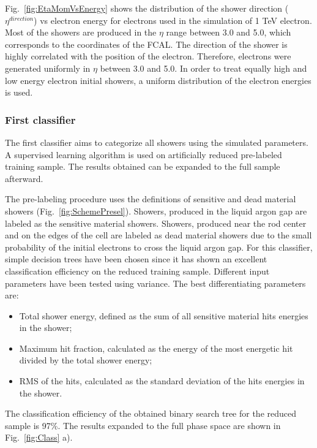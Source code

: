 Fig.~\ref{fig:EtaMomVsEnergy} shows the distribution of the shower direction ($\eta^{direction}$) vs electron energy for electrons used in the simulation of 1 TeV electron. Most of the showers are produced in the $\eta$ range between 3.0 and 5.0, which corresponds to the coordinates of the FCAL. The direction of the shower is highly correlated with the position of the electron. Therefore, electrons were generated uniformly in $\eta$ between 3.0 and 5.0. In order to treat equally high and low energy electron initial showers, a uniform distribution of the electron energies is used.

\begin{figure}[!tbp]
\end{figure}

\subsubsection{First classifier}

The first classifier aims to categorize all showers using the simulated parameters. A supervised learning algorithm is used on artificially reduced pre-labeled training sample. The results obtained can be expanded to the full sample afterward. 
 
The pre-labeling procedure uses the definitions of sensitive and dead material showers (Fig.~\ref{fig:SchemePresel}). Showers, produced in the liquid argon gap are labeled as the sensitive material showers. Showers, produced near the rod center and on the edges of the cell are labeled as dead material showers due to the small probability of the initial electrons to cross the liquid argon gap. For this classifier, simple decision trees have been chosen since it has shown an excellent classification efficiency on the reduced training sample. Different input parameters have been tested using variance. The best differentiating parameters are:
\begin{itemize}
\item Total shower energy, defined as the sum of all sensitive material hits energies in the shower;
\item Maximum hit fraction, calculated as the energy of the most energetic hit divided by the total shower energy;
\item RMS of the hits, calculated as the standard deviation of the hits energies in the shower.
\end{itemize}
The classification efficiency of the obtained binary search tree for the reduced sample is 97\%. The results expanded to the full phase space are shown in Fig.~\ref{fig:Class} a). 

